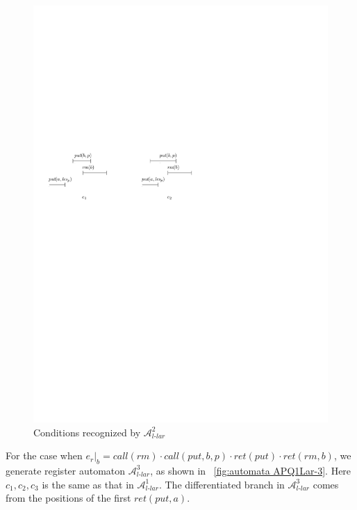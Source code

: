 \begin{figure}[htbp]
  \centering
  \includegraphics[width=0.7 \textwidth]{figures/PIC_HIS_PQ1Lar-prpr.pdf}
  \caption{Conditions recognized by $\mathcal{A}_{\textit{l-lar}}^2$}
  \label{fig:his for APQ1Lar-2}
\end{figure}

For the case when $e_r \vert_{b} = \textit{call}(\textit{rm}) \cdot \textit{call}(\textit{put},b,p) \cdot \textit{ret}(\textit{put}) \cdot \textit{ret}(\textit{rm},b)$, we generate register automaton $\mathcal{A}_{\textit{l-lar}}^3$, as shown in \figurename~\ref{fig:automata APQ1Lar-3}. Here $c_1,c_2,c_3$ is the same as that in $\mathcal{A}_{\textit{l-lar}}^1$. The differentiated branch in $\mathcal{A}_{\textit{l-lar}}^3$ comes from the positions of the first $\textit{ret}(\textit{put},a)$.

